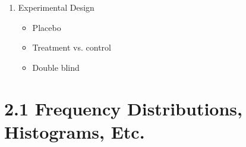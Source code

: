 \documentclass{article}
\begin{document}
\begin{enumerate}
    \item Experimental Design
    
        \begin{itemize}
        \item Placebo
        \item Treatment vs. control
        \item Double blind
        \end{itemize}
        
\end{enumerate}
    
        
        
\section*{2.1 Frequency Distributions, Histograms, Etc.}
\end{document}
